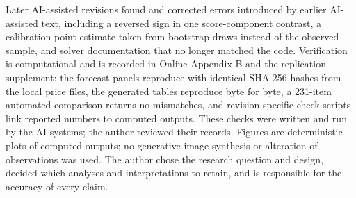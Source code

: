 Later AI-assisted revisions found and corrected errors introduced by earlier AI-assisted text, including a reversed sign in one score-component contrast, a calibration point estimate taken from bootstrap draws instead of the observed sample, and solver documentation that no longer matched the code. Verification is computational and is recorded in Online Appendix B and the replication supplement: the forecast panels reproduce with identical SHA-256 hashes from the local price files, the generated tables reproduce byte for byte, a 231-item automated comparison returns no mismatches, and revision-specific check scripts link reported numbers to computed outputs. These checks were written and run by the AI systems; the author reviewed their records. Figures are deterministic plots of computed outputs; no generative image synthesis or alteration of observations was used. The author chose the research question and design, decided which analyses and interpretations to retain, and is responsible for the accuracy of every claim.
